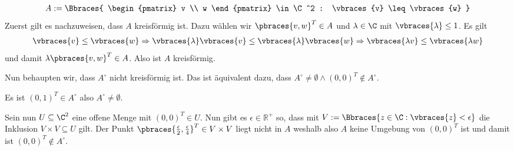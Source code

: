 \begin{solution}
\begin{enumerate}[label = (\roman*)]
  \begin{align*}
    A := \Bbraces{
      \begin{pmatrix}
        v \\ w 
      \end{pmatrix}
      \in \C^2 : \vbraces{v} \leq \vbraces{w} }
  \end{align*} 
  Zuerst gilt es nachzuweisen, dass $A$ kreisförmig ist. Dazu wählen wir $\pbraces{v,w}^T \in A$ und $\lambda \in \C$ mit $\vbraces{\lambda} \leq 1$. Es gilt 
  \begin{align*}
    \vbraces{v} \leq \vbraces{w} \Rightarrow \vbraces{\lambda} \vbraces{v} \leq \vbraces{\lambda} \vbraces{w} \Rightarrow \vbraces{\lambda v} \leq \vbraces{\lambda w}
  \end{align*} 
  und damit $\lambda \pbraces{v, w}^T \in A$. Also ist $A$ kreisförmig.

  Nun behaupten wir, dass $A^\circ$ nicht kreisförmig ist. Das ist äquivalent dazu, dass $A^\circ \neq \emptyset \land (0,0)^T \notin A^\circ$. 
  
  Es ist $(0,1)^T \in A^\circ$ also $A^\circ \neq \emptyset$.
  
  Sein nun $U \subseteq \C^2$ eine offene Menge mit $(0,0)^T \in U$. Nun gibt es $\epsilon \in \mathbb{R}^+$ so, dass mit $V:= \Bbraces{z \in \C : \vbraces{z} < \epsilon}$ die Inklusion $V \times V \subseteq U$ gilt. Der Punkt $\pbraces{\frac{\epsilon}{2}, \frac{\epsilon}{4} }^T \in V \times V$ liegt nicht in $A$ weshalb also $A$ keine Umgebung von $(0,0)^T$ ist und damit ist $(0,0)^T \notin A^\circ$.

\end{enumerate}

\end{solution}
